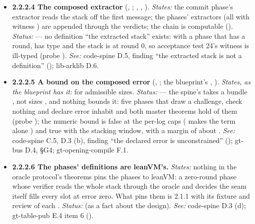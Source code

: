 \begin{itemize}[label={}, leftmargin=1.3em, itemindent=-1.3em, labelwidth=0pt, labelsep=0pt, itemsep=4pt, topsep=3pt]
\begin{itemize}[label={}, leftmargin=1.3em, itemindent=-1.3em, labelwidth=0pt, labelsep=0pt, itemsep=4pt, topsep=3pt]
\item {}\label{obl:node-2.2.2.4}\oblflag\textbf{2.2.2.4 The composed extractor} (, ; , , ). \emph{States:} the commit phase's extractor reads the stack off the first message; the phases' extractors (all with witness ) are appended through the verdicts; the chain is computable (). \emph{Status:}   — no definition ``the extracted stack'' exists: with a phase that has a round,  has type  and the stack is  at round 0, so acceptance test 24's  witness is ill-typed (probe ). \emph{See:} code-spine D.5, finding ``the extracted stack is not a definition'' (); lib-arklib D.6.
\item {}\label{obl:node-2.2.2.5}\oblflag\textbf{2.2.2.5 A bound on the composed error} (, ; the blueprint's , ). \emph{States, as the blueprint has it:}  for admissible sizes. \emph{Status:}   — the spine's  takes a bundle , not sizes , and nothing bounds it: five phases that draw a challenge, check nothing and declare error  inhabit  and both master theorems hold of them (probe ); the numeric bound is false at the per-log caps ( makes the  term alone ) and true with the stacking window, with a margin of about . \emph{See:} code-spine C.5, D.3 (b), finding ``the declared error is unconstrained'' (); gt-bus D.4, §G4; gt-opening-compile F.1.
\item {}\label{obl:node-2.2.2.6}\textbf{2.2.2.6 The phases' definitions are leanVM's.} \emph{States:} nothing in the oracle protocol's theorems pins the phases to leanVM: a zero-round phase whose verifier reads the whole stack through the oracle and decides the seam itself fills every slot at error zero. What pins them is 2.1.1 with its fixture and review of each . \emph{Status:}  (as a fact about the design). \emph{See:} code-spine D.3 (d); gt-table-pub E.4 item 6 ().
\end{itemize}

\end{itemize}
